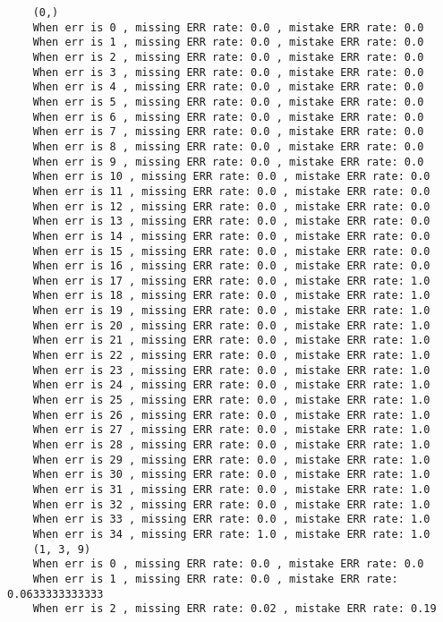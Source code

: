 \documentclass{article}
\begin{document}
  \begin{verbatim}
    (0,)
    When err is 0 , missing ERR rate: 0.0 , mistake ERR rate: 0.0
    When err is 1 , missing ERR rate: 0.0 , mistake ERR rate: 0.0
    When err is 2 , missing ERR rate: 0.0 , mistake ERR rate: 0.0
    When err is 3 , missing ERR rate: 0.0 , mistake ERR rate: 0.0
    When err is 4 , missing ERR rate: 0.0 , mistake ERR rate: 0.0
    When err is 5 , missing ERR rate: 0.0 , mistake ERR rate: 0.0
    When err is 6 , missing ERR rate: 0.0 , mistake ERR rate: 0.0
    When err is 7 , missing ERR rate: 0.0 , mistake ERR rate: 0.0
    When err is 8 , missing ERR rate: 0.0 , mistake ERR rate: 0.0
    When err is 9 , missing ERR rate: 0.0 , mistake ERR rate: 0.0
    When err is 10 , missing ERR rate: 0.0 , mistake ERR rate: 0.0
    When err is 11 , missing ERR rate: 0.0 , mistake ERR rate: 0.0
    When err is 12 , missing ERR rate: 0.0 , mistake ERR rate: 0.0
    When err is 13 , missing ERR rate: 0.0 , mistake ERR rate: 0.0
    When err is 14 , missing ERR rate: 0.0 , mistake ERR rate: 0.0
    When err is 15 , missing ERR rate: 0.0 , mistake ERR rate: 0.0
    When err is 16 , missing ERR rate: 0.0 , mistake ERR rate: 0.0
    When err is 17 , missing ERR rate: 0.0 , mistake ERR rate: 1.0
    When err is 18 , missing ERR rate: 0.0 , mistake ERR rate: 1.0
    When err is 19 , missing ERR rate: 0.0 , mistake ERR rate: 1.0
    When err is 20 , missing ERR rate: 0.0 , mistake ERR rate: 1.0
    When err is 21 , missing ERR rate: 0.0 , mistake ERR rate: 1.0
    When err is 22 , missing ERR rate: 0.0 , mistake ERR rate: 1.0
    When err is 23 , missing ERR rate: 0.0 , mistake ERR rate: 1.0
    When err is 24 , missing ERR rate: 0.0 , mistake ERR rate: 1.0
    When err is 25 , missing ERR rate: 0.0 , mistake ERR rate: 1.0
    When err is 26 , missing ERR rate: 0.0 , mistake ERR rate: 1.0
    When err is 27 , missing ERR rate: 0.0 , mistake ERR rate: 1.0
    When err is 28 , missing ERR rate: 0.0 , mistake ERR rate: 1.0
    When err is 29 , missing ERR rate: 0.0 , mistake ERR rate: 1.0
    When err is 30 , missing ERR rate: 0.0 , mistake ERR rate: 1.0
    When err is 31 , missing ERR rate: 0.0 , mistake ERR rate: 1.0
    When err is 32 , missing ERR rate: 0.0 , mistake ERR rate: 1.0
    When err is 33 , missing ERR rate: 0.0 , mistake ERR rate: 1.0
    When err is 34 , missing ERR rate: 1.0 , mistake ERR rate: 1.0
    (1, 3, 9)
    When err is 0 , missing ERR rate: 0.0 , mistake ERR rate: 0.0
    When err is 1 , missing ERR rate: 0.0 , mistake ERR rate: 0.0633333333333
    When err is 2 , missing ERR rate: 0.02 , mistake ERR rate: 0.19

\end{verbatim}
\end{document}
